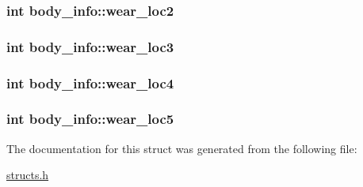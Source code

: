 \hypertarget{structbody__info_a2adaf5d796aa8e451419cd12683fc132}{
\subsubsection[{wear\-\_\-loc2}]{\setlength{\rightskip}{0pt plus 5cm}int body\-\_\-info\-::wear\-\_\-loc2}}\label{structbody__info_a2adaf5d796aa8e451419cd12683fc132}
\hypertarget{structbody__info_a6f96748380df84a15cdd7a7b63c5b01f}{
\subsubsection[{wear\-\_\-loc3}]{\setlength{\rightskip}{0pt plus 5cm}int body\-\_\-info\-::wear\-\_\-loc3}}\label{structbody__info_a6f96748380df84a15cdd7a7b63c5b01f}
\hypertarget{structbody__info_a64a5172067829d0ce05afa46e84e8a18}{
\subsubsection[{wear\-\_\-loc4}]{\setlength{\rightskip}{0pt plus 5cm}int body\-\_\-info\-::wear\-\_\-loc4}}\label{structbody__info_a64a5172067829d0ce05afa46e84e8a18}
\hypertarget{structbody__info_acd7eadf994811223deae1fcb6d655bf8}{
\subsubsection[{wear\-\_\-loc5}]{\setlength{\rightskip}{0pt plus 5cm}int body\-\_\-info\-::wear\-\_\-loc5}}\label{structbody__info_acd7eadf994811223deae1fcb6d655bf8}


The documentation for this struct was generated from the following file\-:\begin{DoxyCompactItemize}
\item 
\hyperlink{structs_8h}{structs.\-h}\end{DoxyCompactItemize}
